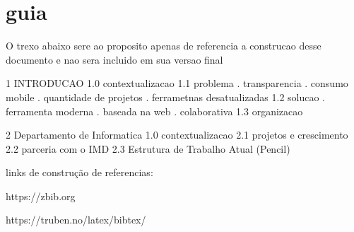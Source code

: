 \chapter[Roteiro]{guia}
\label{ch:guia}
O trexo abaixo sere ao proposito apenas de referencia a construcao desse documento e nao sera incluido em sua versao final

1 INTRODUCAO
    1.0 contextualizacao
    1.1 problema
        . transparencia
        . consumo mobile
        . quantidade de projetos
        . ferrametnas desatualizadas
    1.2 solucao
        . ferramenta moderna
        . baseada na web
        . colaborativa
    1.3 organizacao

2 Departamento de Informatica
    1.0 contextualizacao
    2.1 projetos e crescimento
    2.2 parceria com o IMD
    2.3 Estrutura de Trabalho Atual (Pencil)

links de construção de referencias:

https://zbib.org

https://truben.no/latex/bibtex/
